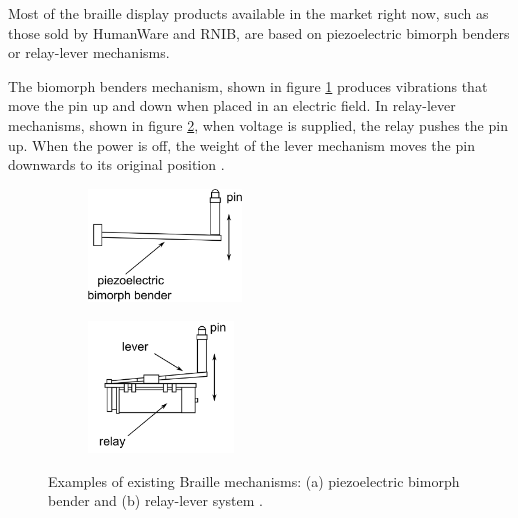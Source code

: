 Most of the braille display products available in the market right now, such as those sold by HumanWare and RNIB, are based on piezoelectric bimorph benders or relay-lever mechanisms.  

The biomorph benders mechanism, shown in figure \ref{fig:piezo-bender} produces vibrations that move the pin up and down when placed in an electric field.
In relay-lever mechanisms, shown in figure \ref{fig:piezo-relay}, when voltage is supplied, the relay pushes the pin up. When the power is off, the weight of the lever mechanism moves the pin downwards to its original position \cite{hernandez_characterization_2009}.

\begin{figure}[ht] \centering
    \begin{subfigure}[b]{0.4\textwidth}\centering
        \includegraphics[height=3cm]{figures/piezo-bender-a.png}
        \caption{}
        \label{fig:piezo-bender}
    \end{subfigure}
    \begin{subfigure}[b]{0.4\textwidth}\centering
        \includegraphics[height=3.5cm]{figures/piezo-bender-b.png}
        \caption{}
        \label{fig:piezo-relay}
    \end{subfigure}
\caption[Examples of existing Braille mechanisms]{Examples of existing Braille mechanisms: (a) piezoelectric bimorph bender and (b) relay-lever system \cite{hernandez_characterization_2009}.}
\label{fig:piezo-bender-schema}
\end{figure}

